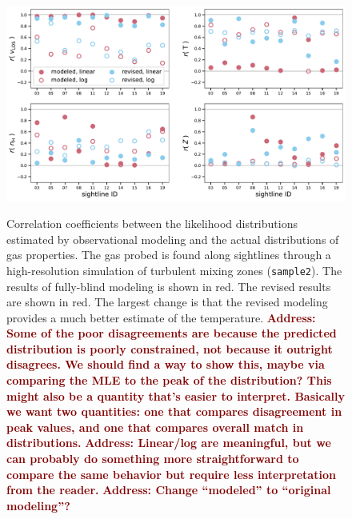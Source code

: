 \documentclass[fleqn,usenatbib]{mnras}
\newcommand{\todo}[1]{\textcolor{Maroon}{\textbf{Address: #1}}}
\begin{document}
\begin{figure}
    \centering
    \includegraphics[width=\textwidth]{figures/sample2/correlations.pdf}
    \label{f: high-res}
    \caption{
    Correlation coefficients between the likelihood distributions estimated by observational modeling and the actual distributions of gas properties.
    The gas probed is found along sightlines through a high-resolution simulation of turbulent mixing zones (\texttt{sample2}).
    The results of fully-blind modeling is shown in red.
    The revised results are shown in red.
    The largest change is that the revised modeling provides a much better estimate of the temperature.
    \todo{Some of the poor disagreements are because the predicted distribution is poorly constrained, not because it outright disagrees.
    We should find a way to show this, maybe via comparing the MLE to the peak of the distribution?
    This might also be a quantity that's easier to interpret.
    Basically we want two quantities: one that compares disagreement in peak values, and one that compares overall match in distributions.}
    \todo{Linear/log are meaningful, but we can probably do something more straightforward to compare the same behavior but require less interpretation from the reader.}
    \todo{Change ``modeled'' to ``original modeling''?}
    }
\end{figure}
\end{document}
